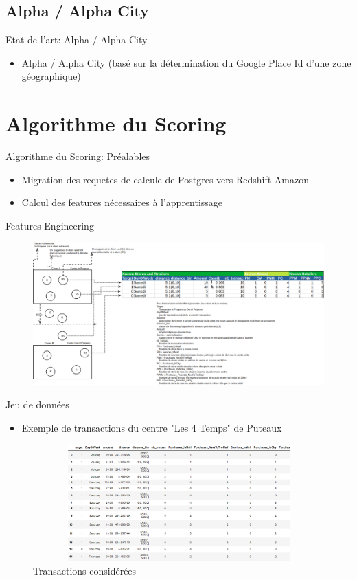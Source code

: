 \documentclass{beamer}
\begin{document}
\subsection{Alpha / Alpha City}
\begin{frame}{Etat de l'art: Alpha / Alpha City}
\begin{itemize}
		\item Alpha / Alpha City (basé sur la détermination du Google Place Id d'une zone géographique)
\end{itemize}
\end{frame} 

\section{Algorithme du Scoring}
\begin{frame}{Algorithme du Scoring: Préalables}
\begin{itemize}
		\item Migration des requetes de calcule de Postgres vers Redshift Amazon
		\item Calcul des features nécessaires à l'apprentissage
\end{itemize}
\end{frame}
\begin{frame}{Features Engineering }
\begin{figure}[H]
    \includegraphics[width=11.5cm,height=5.5cm]{images/feature_engineering.png}
    \label{fig:L1}
\end{figure}
\end{frame}
\begin{frame}{Jeu de données}
\begin{itemize}
		\item Exemple de transactions du centre "Les 4 Temps" de Puteaux
\end{itemize}
\begin{figure}[H]
    \includegraphics[width=12cm,height=4.5cm]{images/dataset_1.png}
    \caption{ Transactions considérées}
    \label{fig:L1}
\end{figure}
\end{frame}
\end{document}
